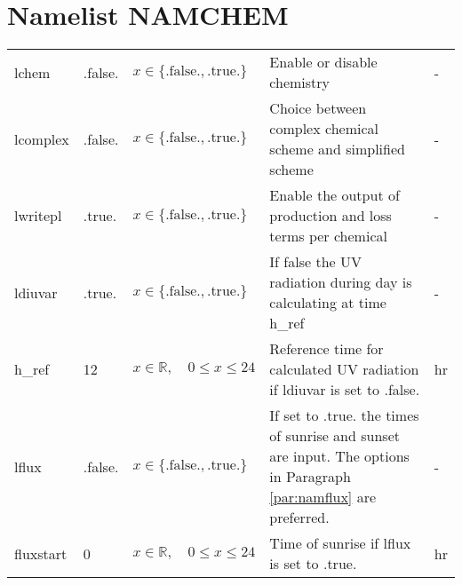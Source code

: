 \documentclass[twoside,11pt,fleqn,a4paper,english,openright]{report}
\begin{document}
\section{Namelist NAMCHEM}\label{par:namchem}
\begin{center}
  \tablelasttail{
        &&&&\\\hline
  }
\begin{supertabular}{|l|p{1.6cm}|p{4cm}|p{6cm}|l|}
lchem		&	.false.	&	$x\in\{\text{.false.},\text{.true.}\}$	& Enable or disable chemistry	& -\\
lcomplex	&	.false.	&	$x\in\{\text{.false.},\text{.true.}\}$	& Choice between complex chemical scheme and simplified scheme	& -\\
lwritepl& .true.	&	$x\in\{\text{.false.},\text{.true.}\}$	& Enable the output of production and loss terms per chemical	& -\\
ldiuvar	&	.true.	&	$x\in\{\text{.false.},\text{.true.}\}$	& If false the UV radiation during day is calculating at time h\_ref	& -\\
h\_ref	& 12			& $x \in \mathbb{R}, \quad 0 \leq x \leq 24$	& Reference time for calculated UV radiation if ldiuvar is set to .false.	&	hr\\
lflux		&	.false.	&	$x\in\{\text{.false.},\text{.true.}\}$	& If set to .true. the times of sunrise and sunset are input. The options in Paragraph \ref{par:namflux} are preferred.	& -\\
fluxstart	&	0			& $x \in \mathbb{R}, \quad 0 \leq x \leq 24$	& Time of sunrise if lflux is set to .true.	&	hr\\

\end{supertabular}
\end{center}
\end{document}
